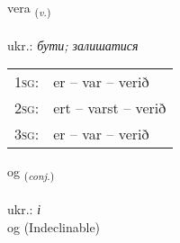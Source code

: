 \documentclass[frontgrid, backgrid]{flacards}\usepackage[]{graphicx}\usepackage[]{xcolor}
\begin{document}
\doublespacing











\renewcommand{\flhead}{\vskip5pt \fboxsep=0pt {\small\bfseries\footnotesize Sagnorð | дієслово}}
\renewcommand{\fcfoot}{\vskip5pt \fboxsep=0pt \hspace{2pt}{\small\bfseries\footnotesize 1K}}

\renewcommand{\blhead}{\vskip5pt {\small\bfseries\footnotesize Sagnorð | дієслово }}
\renewcommand{\bcfoot}{\vskip5pt \hspace{2pt}{\small\bfseries\footnotesize 1K}}


{vera \small{\textsubscript{(\textit{v.})}} \\[1ex] %
\textphonetic{[vɛːra]} \\
ukr.: \emph{бути; залишатися} \\  [2ex]
\renewcommand*{\arraystretch}{0.8}
\begin{tabular}{p{1cm}l}
\textsc{1sg}: & er -- var -- verið \\ 
\textsc{2sg}: & ert -- varst -- verið \\ 
\textsc{3sg}: & er -- var -- verið \\ 
\end{tabular}
}


\renewcommand{\flhead}{\vskip5pt \fboxsep=0pt {\small\bfseries\footnotesize Samtenging | сполучник}}
\renewcommand{\fcfoot}{\vskip5pt \fboxsep=0pt \hspace{2pt}{\small\bfseries\footnotesize 1K}}

\renewcommand{\blhead}{\vskip5pt {\small\bfseries\footnotesize Samtenging | сполучник }}
\renewcommand{\bcfoot}{\vskip5pt \hspace{2pt}{\small\bfseries\footnotesize 1K}}


{og \small{\textsubscript{(\textit{conj.})}} \\[1ex]
\textphonetic{[ɔːɣ]} \\
ukr.: \emph{і} \\  [2ex]
og (Indeclinable)}
\end{document}
